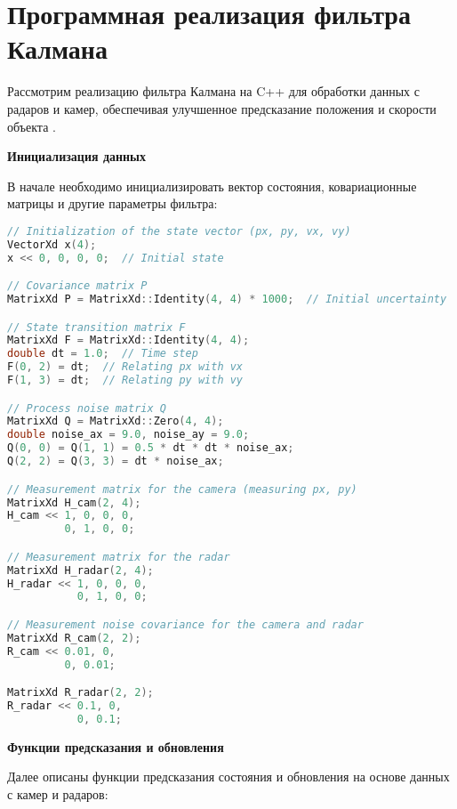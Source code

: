 \chapter{Программная реализация фильтра Калмана}
Рассмотрим реализацию фильтра Калмана на C++ для обработки данных с радаров и камер, обеспечивая улучшенное предсказание положения и скорости объекта \cite{KalmanC++}.

\textbf{Инициализация данных}

В начале необходимо инициализировать вектор состояния, ковариационные матрицы и другие параметры фильтра:

\begin{lstlisting}[language=C++]
// Initialization of the state vector (px, py, vx, vy)
VectorXd x(4);
x << 0, 0, 0, 0;  // Initial state

// Covariance matrix P
MatrixXd P = MatrixXd::Identity(4, 4) * 1000;  // Initial uncertainty

// State transition matrix F
MatrixXd F = MatrixXd::Identity(4, 4);
double dt = 1.0;  // Time step
F(0, 2) = dt;  // Relating px with vx
F(1, 3) = dt;  // Relating py with vy

// Process noise matrix Q
MatrixXd Q = MatrixXd::Zero(4, 4);
double noise_ax = 9.0, noise_ay = 9.0;
Q(0, 0) = Q(1, 1) = 0.5 * dt * dt * noise_ax;
Q(2, 2) = Q(3, 3) = dt * noise_ax;

// Measurement matrix for the camera (measuring px, py)
MatrixXd H_cam(2, 4);
H_cam << 1, 0, 0, 0,
         0, 1, 0, 0;

// Measurement matrix for the radar
MatrixXd H_radar(2, 4);
H_radar << 1, 0, 0, 0,
           0, 1, 0, 0;

// Measurement noise covariance for the camera and radar
MatrixXd R_cam(2, 2);
R_cam << 0.01, 0,
         0, 0.01;

MatrixXd R_radar(2, 2);
R_radar << 0.1, 0,
           0, 0.1;
\end{lstlisting}

\textbf{Функции предсказания и обновления}

Далее описаны функции предсказания состояния и обновления на основе данных с камер и радаров:

